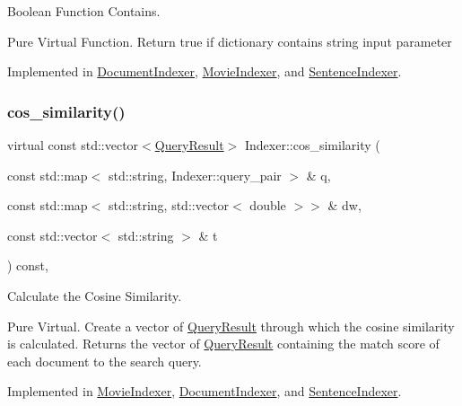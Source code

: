 Boolean Function Contains. 

Pure Virtual Function. Return true if dictionary contains string input parameter 

Implemented in \hyperlink{class_document_indexer_a4bd5fd7be55de9932933dd6f7bfa7d9f}{Document\+Indexer}, \hyperlink{class_movie_indexer_a94c19bb7518b7d219cc88bab1a507030}{Movie\+Indexer}, and \hyperlink{class_sentence_indexer_af3299500d89ff36586472f81eb8efae8}{Sentence\+Indexer}.

\mbox{\label{class_indexer_a52bcf307b7fea4f3c6e7b440bc60d2fe}} 
\subsubsection{\texorpdfstring{cos\+\_\+similarity()}{cos\_similarity()}}
{\footnotesize\ttfamily virtual const std\+::vector$<$\hyperlink{class_query_result}{Query\+Result}$>$ Indexer\+::cos\+\_\+similarity (\begin{DoxyParamCaption}\item[{const std\+::map$<$ std\+::string, Indexer\+::query\+\_\+pair $>$ \&}]{q,  }\item[{const std\+::map$<$ std\+::string, std\+::vector$<$ double $>$$>$ \&}]{dw,  }\item[{const std\+::vector$<$ std\+::string $>$ \&}]{t }\end{DoxyParamCaption}) const\hspace{0.3cm}{\ttfamily [protected]}, {}}



Calculate the Cosine Similarity. 

Pure Virtual. Create a vector of \hyperlink{class_query_result}{Query\+Result} through which the cosine similarity is calculated. Returns the vector of \hyperlink{class_query_result}{Query\+Result} containing the match score of each document to the search query. 

Implemented in \hyperlink{class_movie_indexer_a2e09c1755d3d5b0fa6f238352d1850a7}{Movie\+Indexer}, \hyperlink{class_document_indexer_a8738997048b5bfd336f48bade7715cc6}{Document\+Indexer}, and \hyperlink{class_sentence_indexer_a913914f26a73e00f293308baff97e23f}{Sentence\+Indexer}.

\mbox{\label{class_indexer_adee34c99c25edcfd4a2b2ae6fe06c3cc}} 
